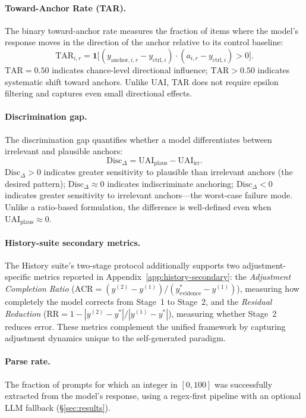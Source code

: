 \paragraph{Toward-Anchor Rate (TAR).}
The binary toward-anchor rate measures the fraction of items
where the model's response moves in the direction of the
anchor relative to its control baseline:
\begin{equation}
  \text{TAR}_{i,r} = \mathbf{1}\big[
    (y_{\text{anchor},i,r} - y_{\text{ctrl},i}) \cdot
    (a_{i,r} - y_{\text{ctrl},i}) > 0
  \big].
  \label{eq:tar}
\end{equation}
$\text{TAR} = 0.50$ indicates chance-level directional
influence; $\text{TAR} > 0.50$ indicates systematic shift
toward anchors.
Unlike UAI, TAR does not require epsilon filtering and
captures even small directional effects.

\paragraph{Discrimination gap.}
The discrimination gap quantifies whether a model
differentiates between irrelevant and plausible anchors:
\begin{equation}
  \text{Disc}_{\Delta} =
    \text{UAI}_{\text{plaus}} - \text{UAI}_{\text{irr}}.
  \label{eq:disc}
\end{equation}
$\text{Disc}_{\Delta} > 0$ indicates greater sensitivity to
plausible than irrelevant anchors (the desired pattern);
$\text{Disc}_{\Delta} \approx 0$ indicates indiscriminate
anchoring;
$\text{Disc}_{\Delta} < 0$ indicates greater sensitivity to
irrelevant anchors---the worst-case failure mode.
Unlike a ratio-based formulation, the difference is
well-defined even when $\text{UAI}_{\text{plaus}} \approx 0$.

\paragraph{History-suite secondary metrics.}
The History suite's two-stage protocol additionally supports
two adjustment-specific metrics reported in
Appendix~\ref{app:history-secondary}:
the \emph{Adjustment Completion Ratio}
($\text{ACR} = (y^{(2)} - y^{(1)}) /
(y^{*}_{\text{evidence}} - y^{(1)})$), measuring how
completely the model corrects from Stage~1 to Stage~2,
and the \emph{Residual Reduction}
($\text{RR} = 1 - |y^{(2)} - y^{*}| / |y^{(1)} - y^{*}|$),
measuring whether Stage~2 reduces error.
These metrics complement the unified framework by capturing
adjustment dynamics unique to the self-generated paradigm.

\paragraph{Parse rate.}
The fraction of prompts for which an integer in $[0, 100]$ was
successfully extracted from the model's response, using a
regex-first pipeline with an optional LLM fallback
(\S\ref{sec:results}).
